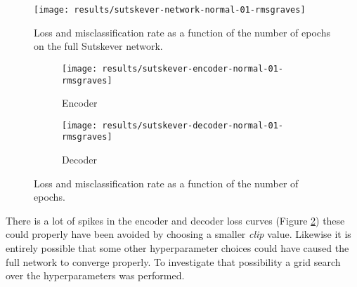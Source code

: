 \begin{figure}[h]
	\centering
	\texttt{[image: results/sutskever-network-normal-01-rmsgraves]}
	\caption{Loss and misclassification rate as a function of the number of epochs on the full Sutskever network.}
	\label{fig:results:sutskever:network-01}
\end{figure}
\begin{figure}[H]
        \vspace{-0.5cm}
        \centering
        \begin{subfigure}[b]{0.49\textwidth}
                \texttt{[image: results/sutskever-encoder-normal-01-rmsgraves]}
                \caption{Encoder}
        \end{subfigure}
        \begin{subfigure}[b]{0.49\textwidth}
                \texttt{[image: results/sutskever-decoder-normal-01-rmsgraves]}
                \caption{Decoder}
        \end{subfigure}
        \caption{Loss and misclassification rate as a function of the number of epochs.}
        \label{fig:results:sutskever:decoder-encoder-01}
\end{figure}

There is a lot of spikes in the encoder and decoder loss curves (Figure \ref{fig:results:sutskever:decoder-encoder-01}) these could properly have been avoided by choosing a smaller \textit{clip} value. Likewise it is entirely possible that some other hyperparameter choices could have caused the full network to converge properly. To investigate that possibility a grid search over the hyperparameters was performed.

